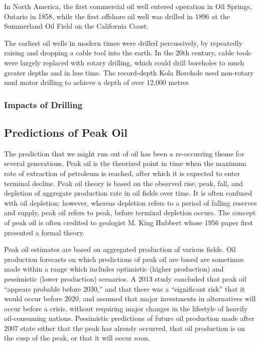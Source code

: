 In North America, the first commercial oil well entered operation in Oil Springs, Ontario in 1858, while the first offshore oil well was drilled in 1896 at the Summerland Oil Field on the California Coast.

The earliest oil wells in modern times were drilled percussively, by repeatedly raising and dropping a cable tool into the earth. In the 20th century, cable tools were largely replaced with rotary drilling, which could drill boreholes to much greater depths and in less time. The record-depth Kola Borehole used non-rotary mud motor drilling to achieve a depth of over 12,000 metres 

\subsubsection{Impacts of Drilling}


\subsection{Predictions of Peak Oil}

The prediction that we might run out of oil has been a re-occurring theme for several generations. Peak oil is the theorized point in time when the maximum rate of extraction of petroleum is reached, after which it is expected to enter terminal decline. Peak oil theory is based on the observed rise, peak, fall, and depletion of aggregate production rate in oil fields over time. It is often confused with oil depletion; however, whereas depletion refers to a period of falling reserves and supply, peak oil refers to peak, before terminal depletion occurs. The concept of peak oil is often credited to geologist M. King Hubbert whose 1956 paper first presented a formal theory.


Peak oil estimates are based on aggregated production of various fields. Oil production forecasts on which predictions of peak oil are based are sometimes made within a range which includes optimistic (higher production) and pessimistic (lower production) scenarios. A 2013 study concluded that peak oil ``appears probable before 2030,'' and that there was a ``significant risk'' that it would occur before 2020, and assumed that major investments in alternatives will occur before a crisis, without requiring major changes in the lifestyle of heavily oil-consuming nations. Pessimistic predictions of future oil production made after 2007 state either that the peak has already occurred, that oil production is on the cusp of the peak, or that it will occur soon.

